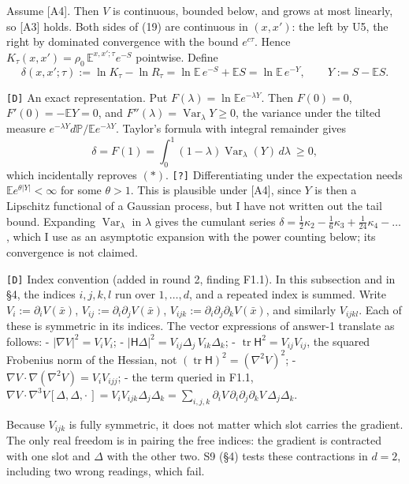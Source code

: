 \documentclass[11pt,a4paper]{article}
\begin{document}
Assume {[}A4{]}. Then \(V\) is continuous, bounded below, and grows at most linearly, so {[}A3{]} holds. Both sides of (19) are continuous in \((x,x')\): the left by U5, the right by dominated convergence with the bound \(e^{c\tau}\). Hence \(K_\tau(x,x')=\rho_0\,\mathbb E^{x,x';\tau}e^{-S}\) pointwise. Define
\[\delta(x,x';\tau):=\ln K_\tau-\ln R_\tau=\ln\mathbb E\,e^{-S}+\mathbb E S=\ln\mathbb E\,e^{-Y},\qquad Y:=S-\mathbb E S.\tag{25}\]

\texttt{[D]} An exact representation. Put \(F(\lambda)=\ln\mathbb E e^{-\lambda Y}\). Then \(F(0)=0\), \(F'(0)=-\mathbb E Y=0\), and \(F''(\lambda)=\operatorname{Var}_\lambda Y\ge0\), the variance under the tilted measure \(e^{-\lambda Y}d\mathbb P/\mathbb E e^{-\lambda Y}\). Taylor's formula with integral remainder gives
\[\delta=F(1)=\int_0^1(1-\lambda)\operatorname{Var}_\lambda(Y)\,d\lambda\ \ge0,\tag{25a}\]
which incidentally reproves \((\ast)\). \texttt{[?]} Differentiating under the expectation needs \(\mathbb E e^{\theta|Y|}<\infty\) for some \(\theta>1\). This is plausible under {[}A4{]}, since \(Y\) is then a Lipschitz functional of a Gaussian process, but I have not written out the tail bound. Expanding \(\operatorname{Var}_\lambda\) in \(\lambda\) gives the cumulant series \(\delta=\tfrac12\kappa_2-\tfrac16\kappa_3+\tfrac1{24}\kappa_4-\dots\), which I use as an asymptotic expansion with the power counting below; its convergence is not claimed.

\texttt{[D]} Index convention (added in round 2, finding F1.1). In this subsection and in §4, the indices \(i,j,k,l\) run over \(1,\dots,d\), and a repeated index is summed. Write \(V_i:=\partial_iV(\bar x)\), \(V_{ij}:=\partial_i\partial_jV(\bar x)\), \(V_{ijk}:=\partial_i\partial_j\partial_kV(\bar x)\), and similarly \(V_{ijkl}\). Each of these is symmetric in its indices. The vector expressions of answer-1 translate as follows:
- \(|\nabla V|^2=V_iV_i\);
- \(|\mathsf H\Delta|^2=V_{ij}\Delta_j\,V_{ik}\Delta_k\);
- \(\operatorname{tr}\mathsf H^2=V_{ij}V_{ij}\), the squared Frobenius norm of the Hessian, not \((\operatorname{tr}\mathsf H)^2=(\nabla^2V)^2\);
- \(\nabla V\cdot\nabla(\nabla^2V)=V_iV_{ijj}\);
- the term queried in F1.1, \(\nabla V\cdot\nabla^3V[\Delta,\Delta,\cdot\,]=V_iV_{ijk}\Delta_j\Delta_k=\sum_{i,j,k}\partial_iV\,\partial_i\partial_j\partial_kV\,\Delta_j\Delta_k\).

Because \(V_{ijk}\) is fully symmetric, it does not matter which slot carries the gradient. The only real freedom is in pairing the free indices: the gradient is contracted with one slot and \(\Delta\) with the other two. S9 (§4) tests these contractions in \(d=2\), including two wrong readings, which fail.
\end{document}
